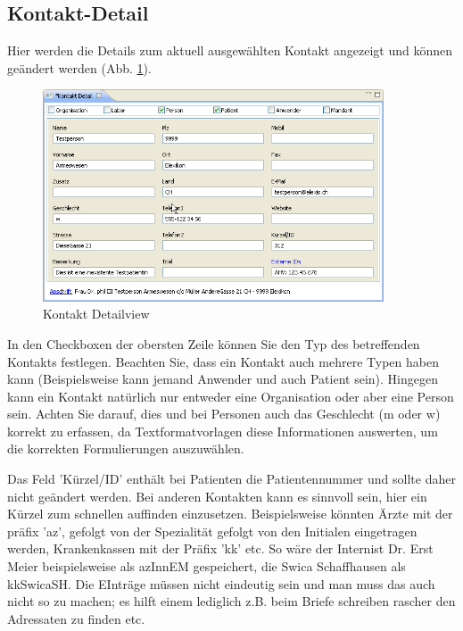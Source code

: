 \subsection{Kontakt-Detail}
Hier werden die Details zum aktuell ausgewählten Kontakt angezeigt und können
geändert werden (Abb. \ref{fig:kontaktdetail}).
\begin{figure}[htp]
\begin{center}
  \includegraphics[width=0.9\textwidth]{images/kontaktdetail}
  \caption{Kontakt Detailview}
  \label{fig:kontaktdetail}
\end{center}
\end{figure}
In den Checkboxen der obersten Zeile können Sie den Typ des betreffenden
Kontakts festlegen. Beachten Sie, dass ein Kontakt auch mehrere Typen haben kann
(Beispielsweise kann jemand Anwender und auch Patient sein). Hingegen kann
ein Kontakt natürlich nur entweder eine Organisation oder aber eine Person sein.
Achten Sie darauf, dies und bei Personen auch das Geschlecht (m oder w) korrekt
zu erfassen, da Textformatvorlagen diese Informationen auswerten, um die
korrekten Formulierungen auszuwählen.

\medskip

Das Feld 'Kürzel/ID' enthält bei Patienten die Patientennummer und sollte daher nicht geändert werden. Bei anderen Kontakten kann es sinnvoll sein, hier ein Kürzel zum schnellen auffinden einzusetzen. Beispielsweise könnten Ärzte mit der präfix 'az', gefolgt von der Spezialität gefolgt von den Initialen eingetragen werden, Krankenkassen mit der Präfix 'kk' etc. So wäre der Internist Dr. Erst Meier beispielsweise als azInnEM gespeichert, die Swica Schaffhausen als kkSwicaSH. Die EInträge müssen nicht eindeutig sein und man muss das auch nicht so zu machen; es hilft einem lediglich z.B. beim Briefe schreiben rascher den Adressaten zu finden etc.

